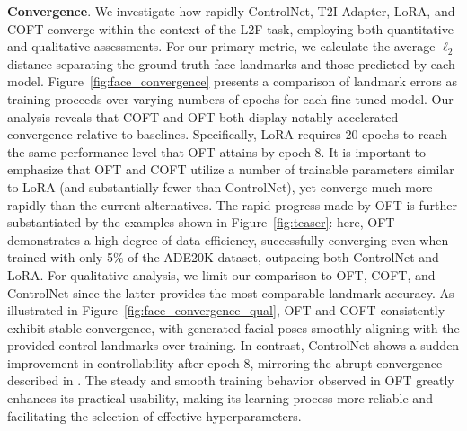 \textbf{Convergence}. We investigate how rapidly ControlNet, T2I-Adapter, LoRA, and COFT converge within the context of the L2F task, employing both quantitative and qualitative assessments. For our primary metric, we calculate the average $\ell_2$ distance separating the ground truth face landmarks and those predicted by each model. Figure~\ref{fig:face_convergence} presents a comparison of landmark errors as training proceeds over varying numbers of epochs for each fine-tuned model. Our analysis reveals that COFT and OFT both display notably accelerated convergence relative to baselines. Specifically, LoRA requires 20 epochs to reach the same performance level that OFT attains by epoch 8. It is important to emphasize that OFT and COFT utilize a number of trainable parameters similar to LoRA (and substantially fewer than ControlNet), yet converge much more rapidly than the current alternatives. The rapid progress made by OFT is further substantiated by the examples shown in Figure~\ref{fig:teaser}: here, OFT demonstrates a high degree of data efficiency, successfully converging even when trained with only 5\% of the ADE20K dataset, outpacing both ControlNet and LoRA. For qualitative analysis, we limit our comparison to OFT, COFT, and ControlNet since the latter provides the most comparable landmark accuracy. As illustrated in Figure~\ref{fig:face_convergence_qual}, OFT and COFT consistently exhibit stable convergence, with generated facial poses smoothly aligning with the provided control landmarks over training. In contrast, ControlNet shows a sudden improvement in controllability after epoch 8, mirroring the abrupt convergence described in \cite{zhang2023adding}. The steady and smooth training behavior observed in OFT greatly enhances its practical usability, making its learning process more reliable and facilitating the selection of effective hyperparameters.

